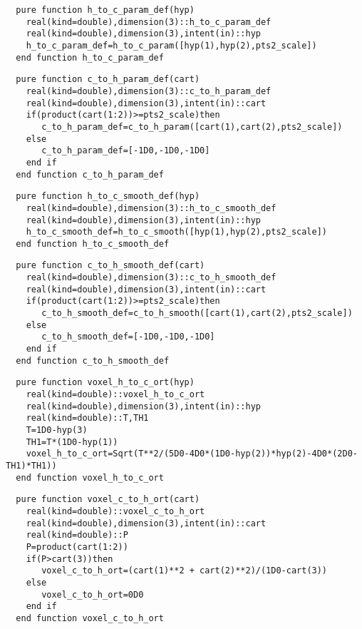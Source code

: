\begin{Verbatim}
  pure function h_to_c_param_def(hyp)
    real(kind=double),dimension(3)::h_to_c_param_def
    real(kind=double),dimension(3),intent(in)::hyp
    h_to_c_param_def=h_to_c_param([hyp(1),hyp(2),pts2_scale])
  end function h_to_c_param_def
\end{Verbatim}
  
\begin{Verbatim}
  pure function c_to_h_param_def(cart)
    real(kind=double),dimension(3)::c_to_h_param_def
    real(kind=double),dimension(3),intent(in)::cart
    if(product(cart(1:2))>=pts2_scale)then
       c_to_h_param_def=c_to_h_param([cart(1),cart(2),pts2_scale])
    else
       c_to_h_param_def=[-1D0,-1D0,-1D0]
    end if
  end function c_to_h_param_def
\end{Verbatim}

\begin{Verbatim}
  pure function h_to_c_smooth_def(hyp)
    real(kind=double),dimension(3)::h_to_c_smooth_def
    real(kind=double),dimension(3),intent(in)::hyp
    h_to_c_smooth_def=h_to_c_smooth([hyp(1),hyp(2),pts2_scale])
  end function h_to_c_smooth_def
\end{Verbatim}
  
\begin{Verbatim}
  pure function c_to_h_smooth_def(cart)
    real(kind=double),dimension(3)::c_to_h_smooth_def
    real(kind=double),dimension(3),intent(in)::cart
    if(product(cart(1:2))>=pts2_scale)then
       c_to_h_smooth_def=c_to_h_smooth([cart(1),cart(2),pts2_scale])
    else
       c_to_h_smooth_def=[-1D0,-1D0,-1D0]
    end if
  end function c_to_h_smooth_def
\end{Verbatim}

\begin{Verbatim}
  pure function voxel_h_to_c_ort(hyp)
    real(kind=double)::voxel_h_to_c_ort
    real(kind=double),dimension(3),intent(in)::hyp
    real(kind=double)::T,TH1
    T=1D0-hyp(3)
    TH1=T*(1D0-hyp(1))
    voxel_h_to_c_ort=Sqrt(T**2/(5D0-4D0*(1D0-hyp(2))*hyp(2)-4D0*(2D0-TH1)*TH1))
  end function voxel_h_to_c_ort
\end{Verbatim}

\begin{Verbatim}
  pure function voxel_c_to_h_ort(cart)
    real(kind=double)::voxel_c_to_h_ort
    real(kind=double),dimension(3),intent(in)::cart
    real(kind=double)::P
    P=product(cart(1:2))
    if(P>cart(3))then
       voxel_c_to_h_ort=(cart(1)**2 + cart(2)**2)/(1D0-cart(3))
    else
       voxel_c_to_h_ort=0D0
    end if
  end function voxel_c_to_h_ort
\end{Verbatim}

